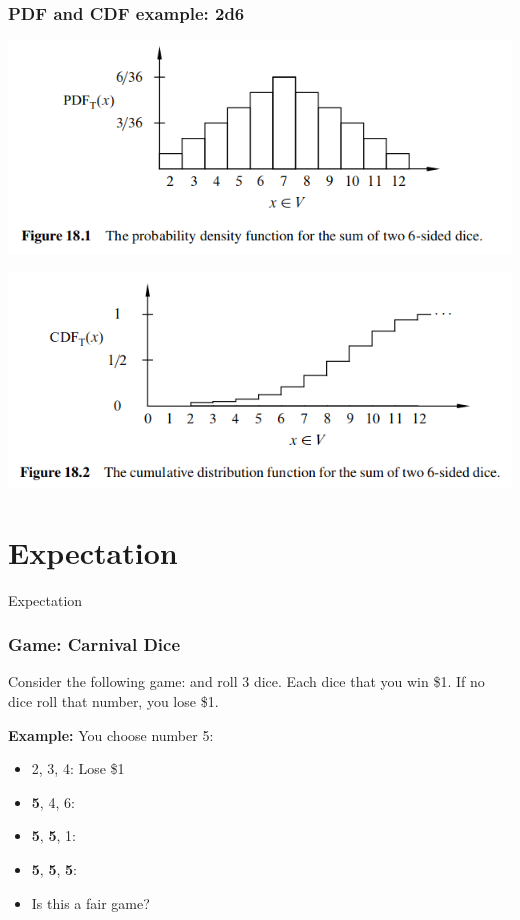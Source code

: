 \documentclass{beamer}
\begin{document}
\begin{frame}
  \frametitle{PDF and CDF example: 2d6}
  \begin{center}
    \includegraphics[height=0.4\textheight]{../img/pdf_2d6}
    \bigskip

    \includegraphics[height=0.4\textheight]{../img/cdf_2d6}
  \end{center}
\end{frame}

\section{Expectation}
\begin{frame}
  \begin{center}
    {\huge
      Expectation
    }
  \end{center}
\end{frame}

\begin{frame}
  \frametitle{Game: Carnival Dice}

  Consider the following game: 
  and roll \alert{3 dice}. Each dice that 
  you win \$1. If \alert{no dice} roll that number, you lose \$1.

  \bigskip

  {\bf Example:} You choose \alert{number 5}:
  \begin{itemize}
  \item<2-> 2, 3, 4: \alert{Lose \$1}
  \item<3-> {\bf 5}, 4, 6: 
  \item<4-> {\bf 5}, {\bf 5}, 1: 
  \item<5-> {\bf 5}, {\bf 5}, {\bf 5}: 
    \bigskip
    
  \item<6> Is this a fair game?
  \end{itemize}  
\end{frame}
\end{document}
